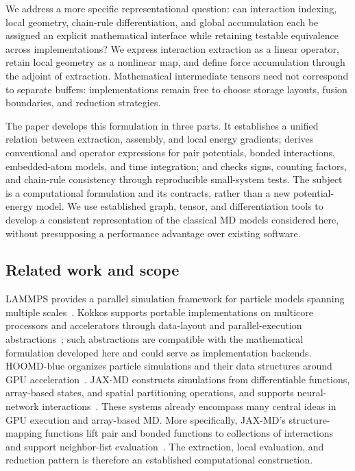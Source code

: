 \documentclass[11pt,a4paper]{article}
\theoremstyle{definition}
\begin{document}
We address a more specific representational question: can interaction indexing, local geometry,
chain-rule differentiation, and global accumulation each be assigned an explicit mathematical
interface while retaining testable equivalence across implementations? We express interaction
extraction as a linear operator, retain local geometry as a nonlinear map, and define force
accumulation through the adjoint of extraction. Mathematical intermediate tensors need not
correspond to separate buffers: implementations remain free to choose storage layouts, fusion
boundaries, and reduction strategies.

The paper develops this formulation in three parts. It establishes a unified relation between
extraction, assembly, and local energy gradients; derives conventional and operator expressions
for pair potentials, bonded interactions, embedded-atom models, and time integration; and checks
signs, counting factors, and chain-rule consistency through reproducible small-system tests. The
subject is a computational formulation and its contracts, rather than a new potential-energy
model. We use established graph, tensor, and differentiation tools to develop a consistent
representation of the classical MD models considered here, without presupposing a performance
advantage over existing software.

\subsection{Related work and scope}
LAMMPS provides a parallel simulation framework for particle models spanning multiple
scales~\cite{thompson2022}. Kokkos supports portable implementations on multicore processors and
accelerators through data-layout and parallel-execution abstractions~\cite{edwards2014}; such
abstractions are compatible with the mathematical formulation developed here and could serve as
implementation backends. HOOMD-blue organizes particle simulations and their data structures
around GPU acceleration~\cite{anderson2020}. JAX-MD constructs simulations from differentiable
functions, array-based states, and spatial partitioning operations, and supports neural-network
interactions~\cite{schoenholz2020}. These systems already encompass many central ideas in GPU
execution and array-based MD. More specifically, JAX-MD's structure-mapping functions lift
pair and bonded functions to collections of interactions and support neighbor-list
evaluation~\cite{jax-smap}. The extraction, local evaluation, and reduction pattern is therefore
an established computational construction.
\end{document}
